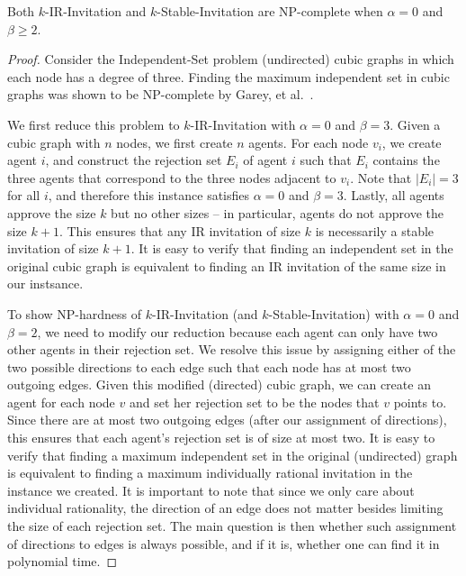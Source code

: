 \begin{theorem} \label{SIP:thm:nphard_a0_b2}
	Both $k$-IR-Invitation and $k$-Stable-Invitation are NP-complete when $\alpha = 0$ and $\beta \geq 2$. 
\end{theorem} 
\begin{proof}
Consider the Independent-Set problem (undirected) cubic graphs in which each node has a degree of three. Finding the maximum independent set in cubic graphs was shown to be NP-complete by Garey, et al.~\cite{Garey_Max_Is_Cubic}. 

We first reduce this problem to $k$-IR-Invitation with $\alpha = 0$ and $\beta = 3$. Given a cubic graph with $n$ nodes, we first create $n$ agents. For each node $v_i$, we create agent $i$, and construct the rejection set $E_i$ of agent $i$ such that $E_i$ contains the three agents that correspond to the three nodes adjacent to $v_i$.  Note that $|E_i| = 3$ for all $i$, and therefore this instance satisfies $\alpha = 0$ and $\beta = 3$. Lastly, all agents approve the size $k$ but no other sizes -- in particular, agents do not approve the size $k+1$. This ensures that any IR invitation of size $k$ is necessarily a stable invitation of size $k+1$. It is easy to verify that finding an independent set in the original cubic graph is equivalent to finding an IR invitation of the same size in our instsance. 
	
To show NP-hardness of $k$-IR-Invitation (and $k$-Stable-Invitation) with $\alpha = 0$ and $\beta = 2$, we need to modify our reduction because each agent can only have two other agents in their rejection set.  We resolve this issue by assigning either of the two possible directions to each edge such that each node has at most two outgoing edges. Given this modified (directed) cubic graph, we can create an agent for each node $v$ and set her rejection set to be the nodes that $v$ points to. Since there are at most two outgoing edges (after our assignment of directions), this ensures that each agent's rejection set is of size at most two. It is easy to verify that finding a maximum independent set in the original (undirected) graph is equivalent to finding a maximum individually rational invitation in the instance we created. It is important to note that since we only care about individual rationality, the direction of an edge does not matter besides limiting the size of each rejection set.  The main question is then whether such assignment of directions to edges is always possible, and if it is, whether one can find it in polynomial time. 


\end{proof}
